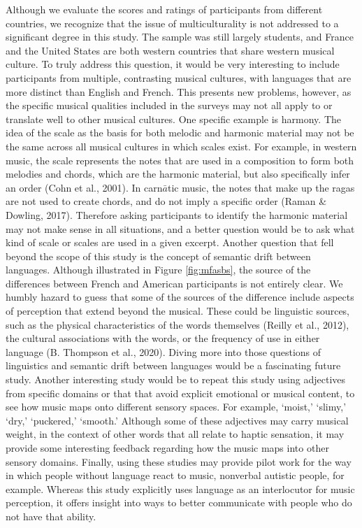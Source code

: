 \documentclass[
  english,
  man,floatsintext]{apa6}
\begin{document}
Although we evaluate the scores and ratings of participants from different countries, we recognize that the issue of multiculturality is not addressed to a significant degree in this study. The sample was still largely students, and France and the United States are both western countries that share western musical culture. To truly address this question, it would be very interesting to include participants from multiple, contrasting musical cultures, with languages that are more distinct than English and French. This presents new problems, however, as the specific musical qualities included in the surveys may not all apply to or translate well to other musical cultures. One specific example is harmony. The idea of the scale as the basis for both melodic and harmonic material may not be the same across all musical cultures in which scales exist. For example, in western music, the scale represents the notes that are used in a composition to form both melodies and chords, which are the harmonic material, but also specifically infer an order (Cohn et al., 2001). In carn\(\bar{a}\)tic music, the notes that make up the ragas are not used to create chords, and do not imply a specific order (Raman \& Dowling, 2017). Therefore asking participants to identify the harmonic material may not make sense in all situations, and a better question would be to ask what kind of scale or scales are used in a given excerpt.
Another question that fell beyond the scope of this study is the concept of semantic drift between languages. Although illustrated in Figure \ref{fig:mfasbs}, the source of the differences between French and American participants is not entirely clear. We humbly hazard to guess that some of the sources of the difference include aspects of perception that extend beyond the musical. These could be linguistic sources, such as the physical characteristics of the words themselves (Reilly et al., 2012), the cultural associations with the words, or the frequency of use in either language (B. Thompson et al., 2020). Diving more into those questions of linguistics and semantic drift between languages would be a fascinating future study.
Another interesting study would be to repeat this study using adjectives from specific domains or that that avoid explicit emotional or musical content, to see how music maps onto different sensory spaces. For example, `moist,' `slimy,' `dry,' `puckered,' `smooth.' Although some of these adjectives may carry musical weight, in the context of other words that all relate to haptic sensation, it may provide some interesting feedback regarding how the music maps into other sensory domains.
Finally, using these studies may provide pilot work for the way in which people without language react to music, nonverbal autistic people, for example. Whereas this study explicitly uses language as an interlocutor for music perception, it offers insight into ways to better communicate with people who do not have that ability.
\end{document}
